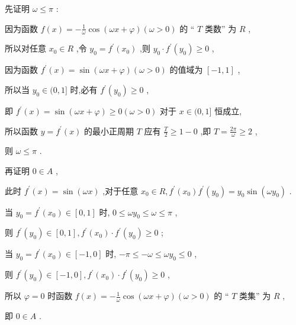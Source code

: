 \documentclass[10pt]{article}
\begin{document}
先证明 \(\omega  \leq  \pi\) :

因为函数 \(f\left( x\right)  =  - \frac{1}{\omega }\cos \left( {{\omega x} + \varphi }\right) \left( {\omega  > 0}\right)\) 的 “ \(T\) 类数” 为 \(R\) ,

所以对任意 \({x}_{0} \in  R\) ,令 \({y}_{0} = {f}^{\prime }\left( {x}_{0}\right)\) ,则 \({y}_{0} \cdot  {f}^{\prime }\left( {y}_{0}\right)  \geq  0\) ,

因为函数 \({f}^{\prime }\left( x\right)  = \sin \left( {{\omega x} + \varphi }\right) \left( {\omega  > 0}\right)\) 的值域为 \(\left\lbrack  {-1,1}\right\rbrack\) ,

所以当 \({y}_{0} \in  (0,1\rbrack\) 时,必有 \({f}^{\prime }\left( {y}_{0}\right)  \geq  0\) ,

即 \({f}^{\prime }\left( x\right)  = \sin \left( {{\omega x} + \varphi }\right)  \geq  0\left( {\omega  > 0}\right)\) 对于 \(x \in  (0,1\rbrack\) 恒成立,

所以函数 \(y = {f}^{\prime }\left( x\right)\) 的最小正周期 \(T\) 应有 \(\frac{T}{2} \geq  1 - 0\) ,即 \(T = \frac{2\pi }{\omega } \geq  2\) ,

则 \(\omega  \leq  \pi\) .

再证明 \(0 \in  A\) ,

此时 \({f}^{\prime }\left( x\right)  = \sin \left( {\omega x}\right)\) ,对于任意 \({x}_{0} \in  R,{f}^{\prime }\left( {x}_{0}\right) {f}^{\prime }\left( {y}_{0}\right)  = {y}_{0}\sin \left( {\omega {y}_{0}}\right)\) .

当 \({y}_{0} = {f}^{\prime }\left( {x}_{0}\right)  \in  \left\lbrack  {0,1}\right\rbrack\) 时, \(0 \leq  \omega {y}_{0} \leq  \omega  \leq  \pi\) ,

则 \({f}^{\prime }\left( {y}_{0}\right)  \in  \left\lbrack  {0,1}\right\rbrack  ,{f}^{\prime }\left( {x}_{0}\right)  \cdot  {f}^{\prime }\left( {y}_{0}\right)  \geq  0\) ;

当 \({y}_{0} = {f}^{\prime }\left( {x}_{0}\right)  \in  \left\lbrack  {-1,0}\right\rbrack\) 时, \(- \pi  \leq   - \omega  \leq  \omega {y}_{0} \leq  0\) ,

则 \({f}^{\prime }\left( {y}_{0}\right)  \in  \left\lbrack  {-1,0}\right\rbrack  ,{f}^{\prime }\left( {x}_{0}\right)  \cdot  {f}^{\prime }\left( {y}_{0}\right)  \geq  0\) ,

所以 \(\varphi  = 0\) 时函数 \(f\left( x\right)  =  - \frac{1}{\omega }\cos \left( {{\omega x} + \varphi }\right) \left( {\omega  > 0}\right)\) 的 “ \(T\) 类集” 为 \(R\) ,

即 \(0 \in  A\) .
\end{document}
